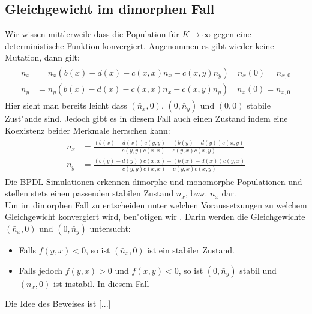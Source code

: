 \documentclass[11pt, a4paper, german]{article}
\begin{document}
	\subsection{Gleichgewicht im dimorphen Fall}
	Wir wissen mittlerweile dass die Population für $ K \to \infty $ gegen eine deterministische Funktion konvergiert. Angenommen es gibt wieder keine Mutation, dann gilt:\\
	\begin{align}
	\begin{split}
		\dot{n}_x & = n_x (b(x) - d(x) - c(x,x)n_x - c(x,y) n_y) \quad n_x(0) = n_{x,0} \\
		\dot{n}_y & = n_y (b(x) - d(x) - c(x,x)n_x - c(x,y) n_y) \quad n_x(0) = n_{x,0}
	\end{split}
	\end{align}
	Hier sieht man bereits leicht dass $ (\bar{n}_x, 0) $, $ (0, \bar{n}_y) $ und $ (0,0) $ stabile Zust"ande sind. Jedoch gibt es in diesem Fall auch einen Zustand indem eine Koexistenz beider Merkmale herrschen kann:
	\begin{align}
	\begin{split}
		n_x &= \frac{(b(x) - d(x))c(y,y)-(b(y)-d(y))c(x,y)}{c(y,y)c(x,x) - c(y,x)c(x,y)}\\
		n_y &= \frac{(b(y) - d(y))c(x,x)-(b(x)-d(x))c(y,x)}{c(y,y)c(x,x) - c(y,x)c(x,y)}
	\end{split}
	\end{align}
	Die BPDL Simulationen erkennen dimorphe und monomorphe Populationen und stellen stets einen passenden stabilen Zustand $ n_x $, bzw. $ \bar{n}_x $ dar. \\
	Um im dimorphen Fall zu entscheiden unter welchen Voraussetzungen zu welchem Gleichgewicht konvergiert wird, ben"otigen wir \cite[Proposition 3]{Champagnat20061127}. Darin werden die Gleichgewichte $ (\bar{n}_x, 0) $ und $ (0, \bar{n}_y) $ untersucht:
	\begin{itemize}
		\item[] Falls $ f(y,x) < 0 $, so ist $ (\bar{n}_x, 0) $ ist ein stabiler Zustand.
		\item[] Falls jedoch $ f(y,x) > 0 $ und $ f(x,y) < 0 $, so ist $ (0, \bar{n}_y) $ stabil und $ (\bar{n}_x, 0) $ ist instabil. In diesem Fall
	\end{itemize}
	Die Idee des Beweises ist [...]\\
	
\end{document}
